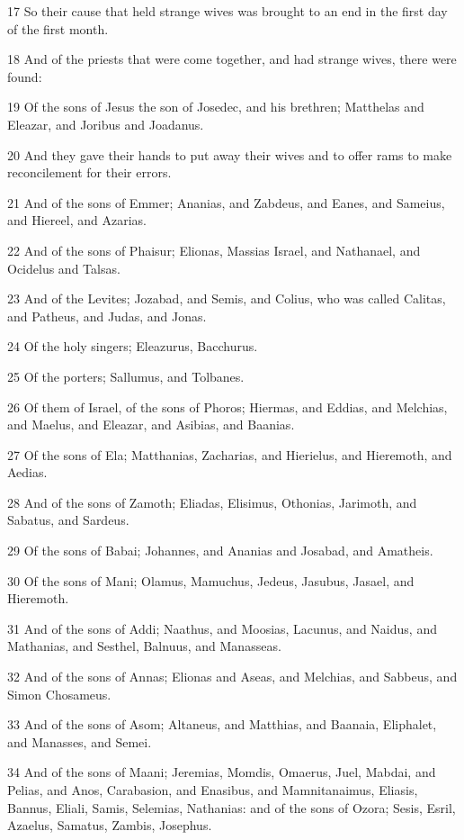 \par 17 So their cause that held strange wives was brought to an end in the first day of the first month.
\par 18 And of the priests that were come together, and had strange wives, there were found:
\par 19 Of the sons of Jesus the son of Josedec, and his brethren; Matthelas and Eleazar, and Joribus and Joadanus.
\par 20 And they gave their hands to put away their wives and to offer rams to make reconcilement for their errors.
\par 21 And of the sons of Emmer; Ananias, and Zabdeus, and Eanes, and Sameius, and Hiereel, and Azarias.
\par 22 And of the sons of Phaisur; Elionas, Massias Israel, and Nathanael, and Ocidelus and Talsas.
\par 23 And of the Levites; Jozabad, and Semis, and Colius, who was called Calitas, and Patheus, and Judas, and Jonas.
\par 24 Of the holy singers; Eleazurus, Bacchurus.
\par 25 Of the porters; Sallumus, and Tolbanes.
\par 26 Of them of Israel, of the sons of Phoros; Hiermas, and Eddias, and Melchias, and Maelus, and Eleazar, and Asibias, and Baanias.
\par 27 Of the sons of Ela; Matthanias, Zacharias, and Hierielus, and Hieremoth, and Aedias.
\par 28 And of the sons of Zamoth; Eliadas, Elisimus, Othonias, Jarimoth, and Sabatus, and Sardeus.
\par 29 Of the sons of Babai; Johannes, and Ananias and Josabad, and Amatheis.
\par 30 Of the sons of Mani; Olamus, Mamuchus, Jedeus, Jasubus, Jasael, and Hieremoth.
\par 31 And of the sons of Addi; Naathus, and Moosias, Lacunus, and Naidus, and Mathanias, and Sesthel, Balnuus, and Manasseas.
\par 32 And of the sons of Annas; Elionas and Aseas, and Melchias, and Sabbeus, and Simon Chosameus.
\par 33 And of the sons of Asom; Altaneus, and Matthias, and Baanaia, Eliphalet, and Manasses, and Semei.
\par 34 And of the sons of Maani; Jeremias, Momdis, Omaerus, Juel, Mabdai, and Pelias, and Anos, Carabasion, and Enasibus, and Mamnitanaimus, Eliasis, Bannus, Eliali, Samis, Selemias, Nathanias: and of the sons of Ozora; Sesis, Esril, Azaelus, Samatus, Zambis, Josephus.
